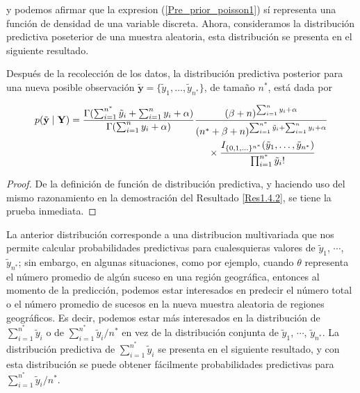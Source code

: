 \documentclass[10pt,openright]{book}\usepackage[]{graphicx}\usepackage[]{color}
\begin{document}
    y podemos afirmar que la expresion (\ref{Pre_prior_poisson1}) s\'i representa una funci\'on de densidad de una variable discreta. Ahora, consideramos la distribuci\'on predictiva poseterior de una muestra aleatoria, esta distribuci\'on se presenta en el siguiente resultado.
    
    \begin{Res}
    \label{ResPoissonPred}
    Despu\'es de la recolecci\'on de los datos, la distribuci\'on predictiva posterior para una nueva posible observaci\'on $\tilde{\mathbf{y}}=\{\tilde{y}_1,\ldots,\tilde{y}_{n^*}\}$, de tama\~no $n^*$, est\'a dada por
    
    \begin{align}
    p(\tilde{\mathbf{y}} \mid \mathbf{Y})&=\frac{\Gamma(\sum_{i=1}^{n^*}\tilde{y}_i+\sum_{i=1}^ny_i+\alpha)}{\Gamma(\sum_{i=1}^ny_i+\alpha)}
    \frac{(\beta+n)^{\sum_{i=1}^ny_i+\alpha}}{({n^*}+\beta+n)^{\sum_{i=1}^{n^*}\tilde{y}_i+\sum_{i=1}^ny_i+\alpha}}\notag\\
    &\hspace{5cm}\times
    \frac{I_{\{0,1,\ldots\}^{n^*}}(\tilde{y}_1,\ldots,\tilde{y}_{n^*})}{\prod_{i=1}^{n^*}\tilde{y}_i!}
    \end{align}
    \end{Res}
    
    \begin{proof}
    De la definici\'on de funci\'on de distribuci\'on predictiva, y haciendo uso del mismo razonamiento en la demostraci\'on del Resultado \ref{Res1.4.2}, se tiene la prueba inmediata.
    \end{proof}
    
    La anterior distribuci\'on corresponde a una distribucion multivariada que nos permite calcular probabilidades predictivas para cualesquieras valores de $\tilde{y}_1$, $\cdots$, $\tilde{y}_{n^*}$; sin embargo, en algunas situaciones, como por ejemplo, cuando $\theta$ representa el n\'umero promedio de alg\'un suceso en una regi\'on geogr\'afica, entonces al momento de la predicci\'on, podemos estar interesados en predecir el n\'umero total o el n\'umero promedio de sucesos en la nueva muestra aleatoria de regiones geogr\'aficos. Es decir, podemos estar m\'as interesados en la distribuci\'on de $\sum_{i=1}^{n^*} \tilde{y}_i$ o de $\sum_{i=1}^{n^*} \tilde{y}_i/n^*$ en vez de la distribuci\'on conjunta de $\tilde{y}_1$, $\cdots$, $\tilde{y}_{n^*}$. La distribuci\'on predictiva de $\sum_{i=1}^{n^*} \tilde{y}_i$ se presenta en el siguiente resultado, y con esta distribuci\'on se puede obtener f\'acilmente probabilidades predictivas para $\sum_{i=1}^{n^*} \tilde{y}_i/n^*$.
    
\end{document}
